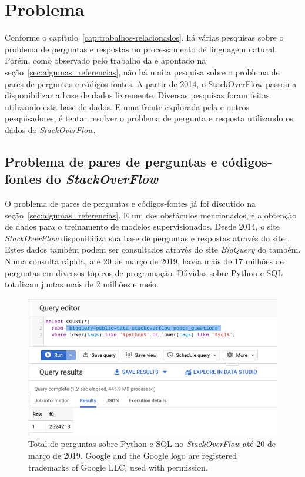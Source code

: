 \chapter{Problema}
\label{cap:problema}

Conforme o capítulo~\ref{cap:trabalhos-relacionados}, há várias pesquisas sobre o problema de perguntas e respostas no processamento de linguagem natural. Porém, como observado pelo trabalho da \cite{yao-2018} e apontado na seção~\ref{sec:algumas_referencias}, não há muita pesquisa sobre o problema de pares de perguntas e códigos-fontes. A partir de 2014, o StackOverFlow passou a disponibilizar a base de dados livremente. Diversas pesquisas foram feitas utilizando esta base de dados. E uma frente explorada pela \cite{yao-2018} e outros pesquisadores, é tentar resolver o problema de pergunta e resposta utilizando os dados do \textit{StackOverFlow}.

\section{Problema de pares de perguntas e códigos-fontes do \textit{StackOverFlow}}

O problema de pares de perguntas e códigos-fontes já foi discutido na seção~\ref{sec:algumas_referencias}. E um dos obstáculos mencionados, é a obtenção de dados para o treinamento de modelos supervisionados. Desde 2014, o site \textit{StackOverFlow} disponibiliza sua base de perguntas e respostas através do site \cite{sof-2019}. Estes dados também podem ser consultados através do site \textit{BigQuery} do \cite{bigquery-2019} também. Numa consulta rápida, até 20 de março de 2019, havia mais de 17 milhões de perguntas em diversos tópicos de programação. Dúvidas sobre Python e SQL totalizam juntas mais de 2 milhões e meio.

\begin{figure}[h]
\includegraphics[width=12cm]{src/figuras/cap-problema/post-questions-python-sql-total.png}
\caption{Total de perguntas sobre Python e SQL no \textit{StackOverFlow} até 20 de março de 2019. Google and the Google logo are registered trademarks of Google LLC, used with permission.}
\label{fig:bigquery-total-questions-python-sql-stackoverflow}
\end{figure}

